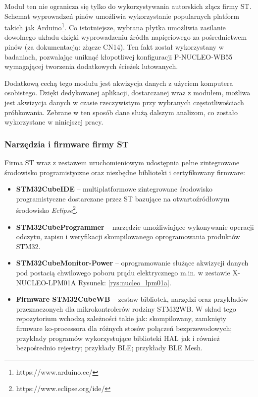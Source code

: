 Moduł ten nie ogranicza się tylko do wykorzystywania autorskich złącz firmy ST. Schemat wyprowadzeń pinów
umożliwia wykorzystanie popularnych platform takich jak Arduino\footnote{https://www.arduino.cc/}. Co istotniejsze, wybrana płytka umożliwia
zasilanie dowolnego układu dzięki wyprowadzeniu źródła napięciowego za pośrednictwem pinów 
(za dokumentacją: złącze CN14). Ten fakt został wykorzystany w badaniach, pozwalając uniknąć kłopotliwej
konfiguracji P-NUCLEO-WB55 wymagającej tworzenia dodatkowych ścieżek lutowanych.

Dodatkową cechą tego modułu jest akwizycja danych z użyciem komputera osobistego. Dzięki dedykowanej
aplikacji, dostarczanej wraz z modułem, możliwa jest akwizycja danych w czasie rzeczywistym przy
wybranych częstotliwościach próbkowania. Zebrane w ten sposób dane służą dalszym analizom, co zostało
wykorzystane w niniejszej pracy. 

\subsubsection{Narzędzia i firmware firmy ST}
Firma ST wraz z zestawem uruchomieniowym udostępnia pełne zintegrowane środowisko
programistyczne oraz niezbędne biblioteki i certyfikowany firmware:

\begin{itemize}
\item \textbf{STM32CubeIDE} \cite{noauthor_stm32cubeide_2022} -- multiplatformowe zintegrowane środowisko programistyczne
dostarczane przez ST bazujące na otwartoźródłowym środowisko \textit{Eclipse}\footnote{https://www.eclipse.org/ide/}.
\item \textbf{STM32CubeProgrammer} \cite{noauthor_stm32cubeprog_2022} -- narzędzie umożliwiające wykonywanie operacji
odczytu, zapisu i weryfikacji skompilowanego oprogramowania produktów STM32. 
\item \textbf{STM32CubeMonitor-Power} \cite{noauthor_stm32cubemonpwr_2022} -- oprogramowanie służące akwizycji danych
pod postacią chwilowego poboru prądu elektrycznego m.in. w zestawie X-NUCLEO-LPM01A Rysunek: \ref{rys:nucleo_lpm01a}.
\item \textbf{Firmware STM32CubeWB} \cite{noauthor_stm32cubewb_2022} -- zestaw bibliotek, narzędzi oraz przykładów
przeznaczonych dla mikrokontrolerów rodziny STM32WB. W skład tego repozytorium wchodzą zależności takie jak:
skompilowany, zamknięty firmware ko-processora dla różnych stosów połączeń bezprzewodowych; przykłady programów
wykorzystujące biblioteki HAL jak i również bezpośrednio rejestry; przykłady BLE; przykłady BLE Mesh.
\end{itemize}

